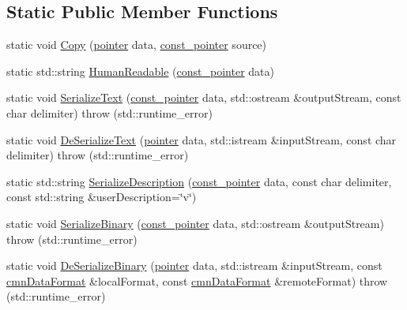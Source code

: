\subsection*{Static Public Member Functions}
\begin{DoxyCompactItemize}
\item 
static void \hyperlink{classcmn_data_3_01__element_type[__size]_4_af9e38a0f19a8ec2923befe529dec2677}{Copy} (\hyperlink{classcmn_data_3_01__element_type[__size]_4_ad12f77b67872d7ed06978b393bc3d29e}{pointer} data, \hyperlink{classcmn_data_3_01__element_type[__size]_4_aaf9e2a181a2500f07b6c99b2bf42477f}{const\-\_\-pointer} source)
\item 
static std\-::string \hyperlink{classcmn_data_3_01__element_type[__size]_4_ab8b19562bfd4f91f8bac12bca4b1dd68}{Human\-Readable} (\hyperlink{classcmn_data_3_01__element_type[__size]_4_aaf9e2a181a2500f07b6c99b2bf42477f}{const\-\_\-pointer} data)
\item 
static void \hyperlink{classcmn_data_3_01__element_type[__size]_4_a1019040d758dae14bb0ff3d5a945e26b}{Serialize\-Text} (\hyperlink{classcmn_data_3_01__element_type[__size]_4_aaf9e2a181a2500f07b6c99b2bf42477f}{const\-\_\-pointer} data, std\-::ostream \&output\-Stream, const char delimiter)  throw (std\-::runtime\-\_\-error)
\item 
static void \hyperlink{classcmn_data_3_01__element_type[__size]_4_a8f48d2bc16c9c0c38290446d20f02773}{De\-Serialize\-Text} (\hyperlink{classcmn_data_3_01__element_type[__size]_4_ad12f77b67872d7ed06978b393bc3d29e}{pointer} data, std\-::istream \&input\-Stream, const char delimiter)  throw (std\-::runtime\-\_\-error)
\item 
static std\-::string \hyperlink{classcmn_data_3_01__element_type[__size]_4_a8a5bf1cc4b195150796f3a29b3886218}{Serialize\-Description} (\hyperlink{classcmn_data_3_01__element_type[__size]_4_aaf9e2a181a2500f07b6c99b2bf42477f}{const\-\_\-pointer} data, const char delimiter, const std\-::string \&user\-Description=\char`\"{}v\char`\"{})
\item 
static void \hyperlink{classcmn_data_3_01__element_type[__size]_4_a4e4ec21a07bb4e00544e1054f33907b2}{Serialize\-Binary} (\hyperlink{classcmn_data_3_01__element_type[__size]_4_aaf9e2a181a2500f07b6c99b2bf42477f}{const\-\_\-pointer} data, std\-::ostream \&output\-Stream)  throw (std\-::runtime\-\_\-error)
\item 
static void \hyperlink{classcmn_data_3_01__element_type[__size]_4_a08bdd36ee24c3dab50ddab4c0bf0f57a}{De\-Serialize\-Binary} (\hyperlink{classcmn_data_3_01__element_type[__size]_4_ad12f77b67872d7ed06978b393bc3d29e}{pointer} data, std\-::istream \&input\-Stream, const \hyperlink{classcmn_data_format}{cmn\-Data\-Format} \&local\-Format, const \hyperlink{classcmn_data_format}{cmn\-Data\-Format} \&remote\-Format)  throw (std\-::runtime\-\_\-error)

\end{DoxyCompactItemize}
